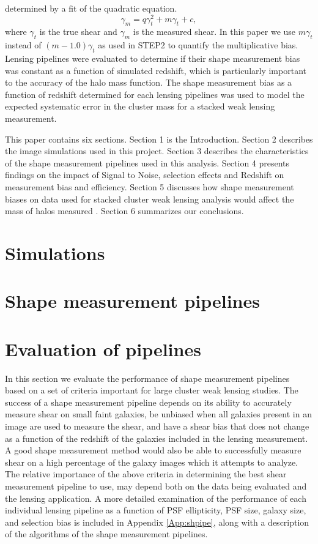 \documentclass[useAMS,usenatbib]{mn2e}
\begin{document}
determined by a fit of the quadratic equation.
\begin{equation}\label{Eqn:QMC}
\gamma_m = q \gamma_t^2 + m \gamma_t + c,
\end {equation}
where $\gamma_t$ is the true shear and $\gamma_m$ is the measured
shear. In this paper we use $m \gamma_t$ instead of  $(m-1.0)
\gamma_t$ as used in STEP2 to quantify the multiplicative bias. Lensing pipelines
were evaluated to determine if their shape measurement bias was
constant as a function of simulated redshift, which is particularly
important to the accuracy of the halo mass function. The shape measurement bias as a
function of redshift determined for each lensing pipelines was used to
model the expected systematic error in the cluster mass for a stacked weak lensing measurement.

This paper contains six sections. Section 1 is the
Introduction. Section 2 describes the image simulations used in this
project. Section 3 describes the characteristics of the shape
measurement pipelines used in this analysis. Section 4 presents
findings on the impact of Signal to  Noise, selection effects and
Redshift on measurement bias and efficiency. Section 5 discusses how
shape measurement biases on data used for stacked cluster weak lensing analysis would affect
the mass of halos measured . Section 6 summarizes our conclusions. 


\section{Simulations}


\section{Shape measurement pipelines}



\section{Evaluation of pipelines}
In this section we evaluate the performance of shape measurement 
pipelines based on a set of criteria important for large cluster weak
lensing studies. The success of a shape measurement pipeline depends
on its ability to accurately measure shear on small faint galaxies, be unbiased
when all galaxies present in an image are used to measure the shear, and
have a shear bias that does not change as a function of the redshift
of the galaxies included in the lensing measurement. A good shape
measurement method would also be able to successfully measure shear on
a high percentage of the galaxy images which it attempts to analyze. 
The relative importance of the above criteria in determining
the best shear measurement pipeline to use, may depend both on the 
data being evaluated and the lensing application. A more detailed examination
of the performance of each individual lensing pipeline 
as a function of PSF ellipticity, PSF size, galaxy size, 
and selection bias is included in Appendix \ref{App:shpipe}, along
with a description of the algorithms of the shape measurement pipelines. \\
\end{document}
